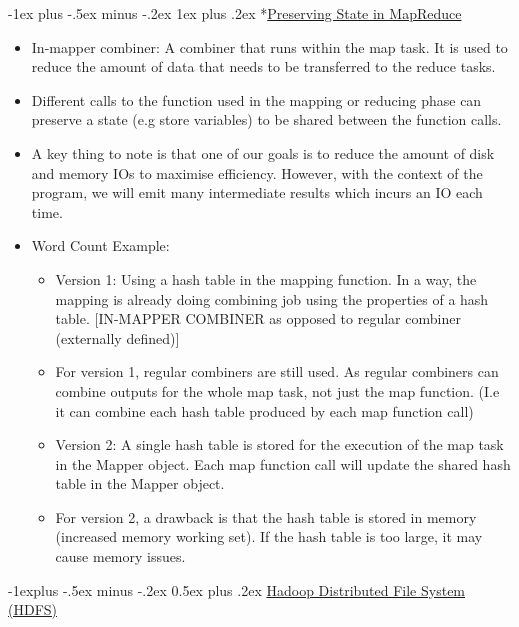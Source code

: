 \documentclass[10pt, landscape]{article}
\makeatletter
\renewcommand{\subsection}{\@startsection{subsection}{2}{0mm}%
  {-1explus -.5ex minus -.2ex}%
  {0.5ex plus .2ex}%
{\normalfont\normalsize\bfseries}}
\renewcommand{\subsubsection}{\@startsection{subsubsection}{3}{0mm}%
  {-1ex plus -.5ex minus -.2ex}%
  {1ex plus .2ex}%
{\normalfont\small\bfseries}}%
\makeatother
\begin{document}
\begin{multicols*}{4}
  \subsubsection*{\underline{Preserving State in MapReduce}}
  \begin{itemize}
    \item In-mapper combiner: A combiner that runs within the map task. It is used to reduce the amount of data that needs to be transferred to the reduce tasks.
    \item Different calls to the function used in the mapping or reducing phase can preserve a state (e.g store variables) to be shared between the function calls.
    \item A key thing to note is that one of our goals is to reduce the amount of disk and memory IOs to maximise efficiency. However, with the context of the program, we will emit many intermediate results which incurs an IO each time.
    \item Word Count Example:
    \begin{itemize}
      \item Version 1: Using a hash table in the mapping function. In a way, the mapping is already doing combining job using the properties of a hash table. [IN-MAPPER COMBINER as opposed to regular combiner (externally defined)]
      \item For version 1, regular combiners are still used. As regular combiners can combine outputs for the whole map task, not just the map function. (I.e it can combine each hash table produced by each map function call)
      \item Version 2: A single hash table is stored for the execution of the map task in the Mapper object. Each map function call will update the shared hash table in the Mapper object.
      \item For version 2, a drawback is that the hash table is stored in memory (increased memory working set). If the hash table is too large, it may cause memory issues.
    \end{itemize}
  \end{itemize}

  \subsection{\underline{Hadoop Distributed File System (HDFS)}}


\end{multicols*}
\end{document}
